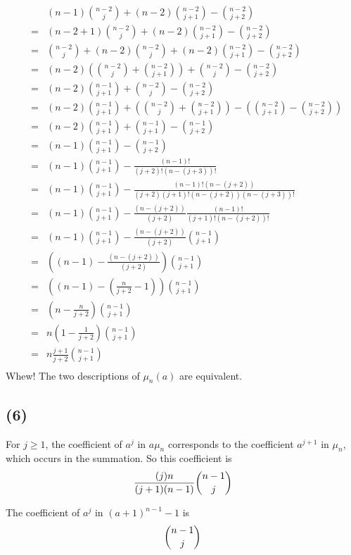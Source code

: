 \documentclass{article}
\begin{document}
\begin{eqnarray*}
& & (n-1)\binom{n-2}{j} + (n-2)\binom{n-2}{j+1} - \binom{n-2}{j+2} \\
&=& (n-2 + 1)\binom{n-2}{j} + (n-2)\binom{n-2}{j+1} - \binom{n-2}{j+2} \\
&=& \binom{n-2}{j} + (n-2)\binom{n-2}{j} + (n-2)\binom{n-2}{j+1} - \binom{n-2}{j+2} \\
&=& (n-2)\left(\binom{n-2}{j} + \binom{n-2}{j+1}\right) + \binom{n-2}{j} - \binom{n-2}{j+2} \\
&=& (n-2)\binom{n-1}{j + 1} + \binom{n-2}{j} - \binom{n-2}{j+2} \\
&=& (n-2)\binom{n-1}{j + 1} + \left( \binom{n-2}{j} + \binom{n-2}{j+1}  \right)-
\left( \binom{n-2}{j+1} - \binom{n-2}{j+2}  \right)\\
&=& (n-2)\binom{n-1}{j + 1} + \binom{n-1}{j+1} - \binom{n-1}{j+2}\\
&=& (n-1)\binom{n-1}{j + 1} - \binom{n-1}{j+2}\\
&=& (n-1)\binom{n-1}{j + 1} - \frac{(n-1)!}{(j+2)!(n-(j+3))!}\\
&=& (n-1)\binom{n-1}{j + 1} - \frac{(n-1)!(n-(j+2))}{(j+2)(j+1)!(n-(j+2))(n-(j+3))!}\\
&=& (n-1)\binom{n-1}{j + 1} - \frac{(n-(j+2))}{(j+2)}\frac{(n-1)!}{(j+1)!(n-(j+2))!}\\
&=& (n-1)\binom{n-1}{j + 1} - \frac{(n-(j+2))}{(j+2)}\binom{n-1}{j+1}\\
&=& \left( (n-1)- \frac{(n-(j+2))}{(j+2)} \right)\binom{n-1}{j+1}\\
&=& \left( (n-1)- \left(\frac{n}{j+2} - 1\right) \right)\binom{n-1}{j+1}\\
&=& \left( n- \frac{n}{j+2} \right)\binom{n-1}{j+1}\\
&=& n\left(1 - \frac{1}{j+2} \right)\binom{n-1}{j+1}\\
&=& n\frac{j+1}{j+2} \binom{n-1}{j+1}\\
\end{eqnarray*}
Whew! The two descriptions of $\mu_n(a)$ are equivalent.
\subsection{(6)}
For $j\ge 1$, the coefficient of $a^j$ in $a\mu_n$ corresponds to the coefficient $a^{j+1}$ in $\mu_n$, which occurs in the summation. So this coefficient is \[\dfrac{(j)n}{(j+1)(n-1)} \dbinom{n-1}{j}\] 

The coefficient of $a^j$ in $(a+1)^{n-1}-1$ is 
\[\dbinom{n-1}{j}\]
\end{document}
